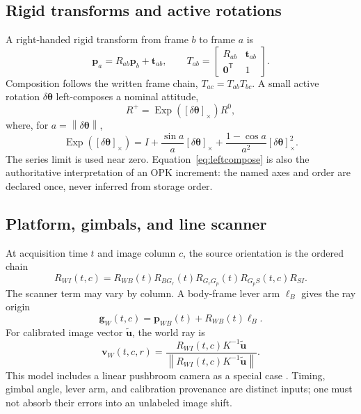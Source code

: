 \documentclass[journal]{IEEEtran}
\newcommand{\T}{^{\mathsf T}}
\newcommand{\skewm}[1]{\left[#1\right]_{\times}}
\newcommand{\norm}[1]{\left\lVert #1\right\rVert}
\newcommand{\Exp}{\operatorname{Exp}}
\begin{document}
\subsection{Rigid transforms and active rotations}

A right-handed rigid transform from frame $b$ to frame $a$ is
\begin{equation}
\bm p_a=R_{ab}\bm p_b+\bm t_{ab},\qquad
T_{ab}=\begin{bmatrix}R_{ab}&\bm t_{ab}\\\bm0\T&1\end{bmatrix}.
\label{eq:rigid}
\end{equation}
Composition follows the written frame chain, $T_{ac}=T_{ab}T_{bc}$. A small
active rotation $\delta\bm\theta$ left-composes a nominal attitude,
\begin{equation}
R^{+}=\Exp(\skewm{\delta\bm\theta})R^0,
\label{eq:leftcompose}
\end{equation}
where, for $a=\norm{\delta\bm\theta}$,
\begin{equation}
\Exp(\skewm{\delta\bm\theta})=I+
\frac{\sin a}{a}\skewm{\delta\bm\theta}+
\frac{1-\cos a}{a^2}\skewm{\delta\bm\theta}^2.
\label{eq:rodrigues}
\end{equation}
The series limit is used near zero. Equation~\eqref{eq:leftcompose} is also the
authoritative interpretation of an OPK increment: the named axes and order are
declared once, never inferred from storage order.

\subsection{Platform, gimbals, and line scanner}

At acquisition time $t$ and image column $c$, the source orientation is the
ordered chain
\begin{equation}
R_{WI}(t,c)=R_{WB}(t)R_{BG_r}(t)R_{G_rG_p}(t)
R_{G_pS}(t,c)R_{SI}.
\label{eq:sensorchain}
\end{equation}
The scanner term may vary by column. A body-frame lever arm $\bm\ell_B$ gives
the ray origin
\begin{equation}
\bm g_W(t,c)=\bm p_{WB}(t)+R_{WB}(t)\bm\ell_B.
\label{eq:lever}
\end{equation}
For calibrated image vector $\tilde{\bm u}$, the world ray is
\begin{equation}
\bm v_W(t,c,r)=
\frac{R_{WI}(t,c)K^{-1}\tilde{\bm u}}
{\norm{R_{WI}(t,c)K^{-1}\tilde{\bm u}}}.
\label{eq:rayformation}
\end{equation}
This model includes a linear pushbroom camera as a special case
\cite{GuptaHartley1997}. Timing, gimbal angle, lever arm, and calibration
provenance are distinct inputs; one must not absorb their errors into an
unlabeled image shift.
\end{document}
